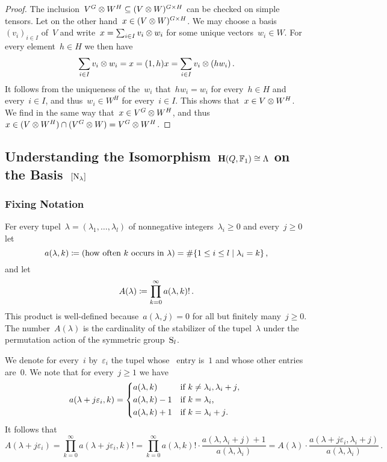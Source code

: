 \documentclass[a4paper, 11pt, twoside=semi]{scrartcl}
\begin{document}
\begin{proof}
  The inclusion~$V^G \otimes W^H \subseteq (V \otimes W)^{G \times H}$ can be checked on simple tensors.
  Let on the other hand~$x \in (V \otimes W)^{G \times H}$.
  We may choose a basis~$(v_i)_{i \in I}$ of~$V$ and write~$x = \sum_{i \in I} v_i \otimes w_i$ for some unique vectors~$w_i \in W$.
  For every element~$h \in H$ we then have
  \[
    \sum_{i \in I} v_i \otimes w_i
    =
    x
    =
    (1,h) x
    =
    \sum_{i \in I} v_i \otimes (h w_i) \,.
  \]
  It follows from the uniqueness of the~$w_i$ that~$h w_i = w_i$ for every~$h \in H$ and every~$i \in I$, and thus~$w_i \in W^H$ for every~$i \in I$.
  This shows that~$x \in V \otimes W^H$.
  We find in the same way that~$x \in V^G \otimes W^H$, and thus~$x \in (V \otimes W^H) \cap (V^G \otimes W) = V^G \otimes W^H$.
\end{proof}



\subsection{Understanding the Isomorphism~$\mathbf{H}(Q, \mathbb{F}_1) \cong \Lambda$ on the Basis~$[ \mathrm{N}_\lambda ]$}
\label{understanding the iso on a basis}

\subsubsection{Fixing Notation}

Fer every tupel~$\lambda = (\lambda_1, \dotsc, \lambda_l)$ of nonnegative integers~$\lambda_i \geq 0$ and every~$j \geq 0$ let
\[
  a(\lambda, k)
  \defined
  ( \text{how often~$k$ occurs in~$\lambda$} )
  =
  \counting
  \{
    1 \leq i \leq l
  \suchthat
    \lambda_i = k
  \} \,,
\]
and let
\[
  A(\lambda)
  \coloneqq
  \prod_{k=0}^\infty a(\lambda, k)! \,.
\]
This product is well-defined because~$a(\lambda, j) = 0$ for all but finitely many~$j \geq 0$.
The number~$A(\lambda)$ is the cardinality of the stabilizer of the tupel~$\lambda$ under the permutation action of the symmetric group~$\mathrm{S}_l$.


We denote for every~$i$ by~$\varepsilon_i$ the tupel whose~ entry is~$1$ and whose other entries are~$0$.
We note that for every~$j \geq 1$ we have
\[
  a(\lambda + j \varepsilon_i, k)
  =
  \begin{cases*}
    a(\lambda, k)
    &
    if~$k \neq \lambda_i, \lambda_i + j$,
    \\
    a(\lambda, k) - 1
    &
    if~$k = \lambda_i$,
    \\
    a(\lambda, k) + 1
    &
    if~$k = \lambda_i + j$.
  \end{cases*}
\]
It follows that
\[
  A(\lambda + j \varepsilon_i)
  =
  \prod_{k=0}^\infty
  a(\lambda + j \varepsilon_i, k)!
  =
  \prod_{k=0}^\infty
  a(\lambda, k)!
  \cdot
  \frac
  {
    a(\lambda, \lambda_i + j) + 1
  }{
    a(\lambda, \lambda_i)
  }
  =
  A(\lambda)
  \cdot
  \frac
  {
    a(\lambda + j \varepsilon_i, \lambda_i + j)
  }{
    a(\lambda, \lambda_i)
  } \,.
\]
\end{document}
